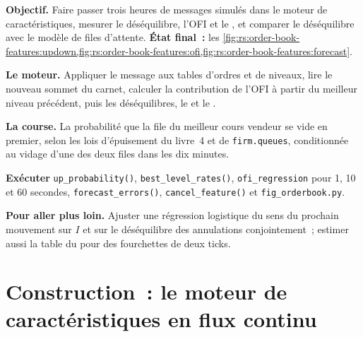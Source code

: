 \begin{tutorial}
\textbf{Objectif.} Faire passer trois heures de messages simulés dans le moteur de caractéristiques, mesurer le déséquilibre, l'OFI et le , et comparer le
déséquilibre avec le modèle de files d'attente. \textbf{État final~:}
les \cref{fig:rs:order-book-features:updown,fig:rs:order-book-features:ofi,fig:rs:order-book-features:forecast}.
\begin{tutsteps}
\item \textbf{Le moteur.} Appliquer le message aux tables d'ordres et de niveaux, lire le nouveau sommet du carnet, calculer la contribution
de l'OFI à partir du meilleur niveau précédent, puis les déséquilibres, le  et le .
\label{lst:rs:order-book-features:engine}
\item \textbf{La course.} La probabilité que la file du meilleur cours vendeur se vide en premier, selon les lois d'épuisement du livre~4 et de
\texttt{firm.queues}, conditionnée au vidage d'une des deux files dans les dix minutes.
\label{lst:rs:order-book-features:race}
\item \textbf{Exécuter} \texttt{up\_probability()}, \texttt{best\_level\_rates()}, \texttt{ofi\_regression} pour 1, 10 et 60 secondes,
\texttt{forecast\_errors()}, \texttt{cancel\_feature()} et \texttt{fig\_orderbook.py}.
\end{tutsteps}
\textbf{Pour aller plus loin.} Ajuster une régression logistique du sens du prochain mouvement sur $I$ et sur le déséquilibre des annulations conjointement~;
estimer aussi la table du  pour des fourchettes de deux ticks.
\end{tutorial}

\section{Construction~: le moteur de caractéristiques en flux continu}\label{bld:rs:order-book-features:lobfeat}

